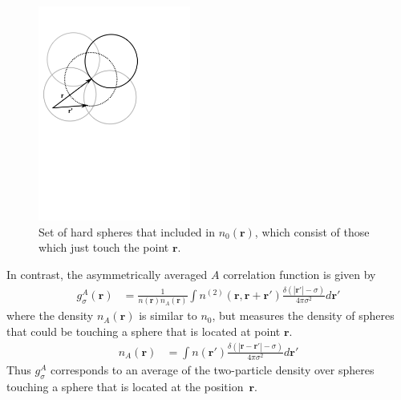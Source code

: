 \documentclass[letterpaper,twocolumn,amsmath,amssymb,jcp,10pt,aip]{revtex4-1}
\newcommand{\rr}{\textbf{r}}
\begin{document}
\begin{figure}
\includegraphics[width=5cm]{figs/n0}
\caption{Set of hard spheres that included in $n_0(\mathbf{r})$, which
  consist of those which just touch the point $\mathbf{r}$.}
\label{fig:n0}
\end{figure}

In contrast, the asymmetrically averaged $A$ correlation function is
given by
\begin{align}
  g^A_\sigma(\rr) &= \frac{1}{n(\rr)n_A(\rr)}
  \int n^{(2)}(\rr, \rr + \rr')
  \frac{\delta(|\rr'| - \sigma)}{4\pi\sigma^2}d\rr' \label{eq:gA}
\end{align}
where the density $n_A(\rr)$ is similar to $n_0$, but measures the
density of spheres that could be touching a sphere that is located at
point $\rr$.
\begin{align}
  n_A(\rr) &= \int n(\rr')
  \frac{\delta(|\rr-\rr'|-\sigma)}{4\pi\sigma^2} d\rr' \label{eq:nA}
\end{align}
Thus $g_\sigma^A$ corresponds to an average of the two-particle
density over spheres touching a sphere that is located at the
position~$\rr$.

\end{document}

